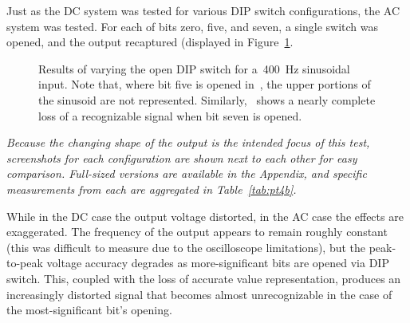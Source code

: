 Just as the DC system was tested for various DIP switch configurations, the AC system was tested.  For each of bits zero, five, and seven, a single switch was opened, and the output recaptured (displayed in Figure~\ref{fig:pt4b}.
%
\begin{figure}[H]
	\centering
	\quad
	\quad

	\parbox{.8\textwidth}{
	\caption[\SI{400}{\hertz} Sine Wave --- DIP Switches]{Results of varying the open DIP switch for a~\SI{400}{\hertz} sinusoidal input.  Note that, where bit five is opened in~, the upper portions of the sinusoid are not represented.  Similarly,~ shows a nearly complete loss of a recognizable signal when bit seven is opened.}
	\label{fig:pt4b}}
\end{figure}
%
\emph{Because the changing shape of the output is the intended focus of this test, screenshots for each configuration are shown next to each other for easy comparison.  Full-sized versions are available in the Appendix, and specific measurements from each are aggregated in Table~\ref{tab:pt4b}.}
%
\begin{table}[H]
	\centering
	
	\parbox{.6\textwidth}{
	\caption[\SI{400}{\hertz} DIP Switches]{Measured output of a varying state of DIP switch positions for a~\SI{400}{\hertz} sinusoidal input.}
	\label{tab:pt4b}}
\end{table}
%
While in the DC case the output voltage distorted, in the AC case the effects are exaggerated.  The frequency of the output appears to remain roughly constant (this was difficult to measure due to the oscilloscope limitations), but the peak-to-peak voltage accuracy degrades as more-significant bits are opened via DIP switch.  This, coupled with the loss of accurate value representation, produces an increasingly distorted signal that becomes almost unrecognizable in the case of the most-significant bit's opening.

